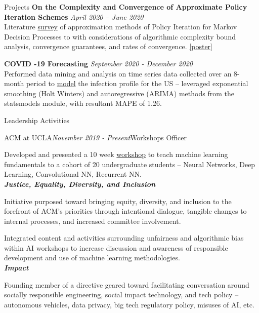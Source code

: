 \documentclass{resume}
\begin{document}
\begin{rSection}{Projects}
{\bf On the Complexity and Convergence of Approximate Policy Iteration Schemes} \hfill {\em April 2020 – June 2020}
\\Literature \href{https://github.com/joostinyi/ECE239AS/blob/master/RL_S20.pdf}{survey} of approximation methods of Policy Iteration
for Markov Decision Processes to with considerations of algorithmic complexity bound analysis, convergence guarantees, and rates of convergence. 
\href{https://github.com/joostinyi/ECE239AS/blob/master/Approximate-Policy-Iteration-Poster.pdf}{[poster]}

{\bf COVID -19 Forecasting} \hfill {\em September 2020 - December 2020}
\\Performed data mining and analysis on time series data collected over an 8-month period to \href{https://github.com/yashlala/cs-145-project}{model} the infection profile
for the US – leveraged exponential smoothing (Holt Winters) and autoregressive (ARIMA) methods from the statsmodels module, with resultant MAPE of 1.26.

\end{rSection}

\begin{rSection}{Leadership Activities}
    \begin{rSubsection}{ACM at UCLA}{\em November 2019 - Present}{Workshops Officer}{}
        \item Developed and presented a 10 week \href{https://www.youtube.com/playlist?list=PLPO7_kXilXFYGa-3ZpOXa7Z01ZYAtUh1U}{workshop}
        to teach machine learning fundamentals to a cohort of 20 undergraduate students – Neural Networks, Deep Learning, Convolutional NN, Recurrent NN.\\
        {\textbf{\em Justice, Equality, Diversity, and Inclusion}}
        \item Initiative purposed toward bringing equity, diversity, and inclusion to the forefront of ACM’s priorities through intentional dialogue,
        tangible changes to internal processes, and increased committee involvement.
        \item Integrated content and activities surrounding unfairness and algorithmic bias within AI workshops to increase discussion and awareness
        of responsible development and use of machine learning methodologies.\\
        {\textbf{\em Impact}}
        \item Founding member of a directive geared toward facilitating conversation around socially responsible engineering, social impact technology, and tech policy
        – autonomous vehicles, data privacy, big tech regulatory policy, misuses of AI, etc.\\
    \end{rSubsection}
\end{rSection}
\end{document}
